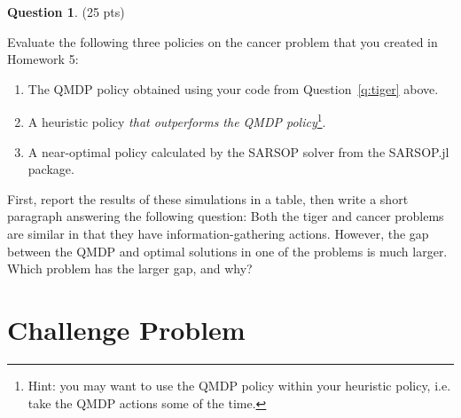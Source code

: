 \documentclass{article}
\theoremstyle{definition}
\newtheorem{question}[thm]{Question}
\begin{document}
\begin{question}
    (25 pts)

    Evaluate the following three policies on the cancer problem that you created in Homework 5:
    \begin{enumerate}[noitemsep]
        \item The QMDP policy obtained using your code from Question~\ref{q:tiger} above.
        \item A heuristic policy \emph{that outperforms the QMDP policy}\footnote{Hint: you may want to use the QMDP policy within your heuristic policy, i.e. take the QMDP actions some of the time.}.
        \item A near-optimal policy calculated by the SARSOP solver from the SARSOP.jl package.
    \end{enumerate}
    First, report the results of these simulations in a table, then write a short paragraph answering the following question: Both the tiger and cancer problems are similar in that they have information-gathering actions. However, the gap between the QMDP and optimal solutions in one of the problems is much larger. Which problem has the larger gap, and why?
\end{question}

\section{Challenge Problem}
\end{document}
